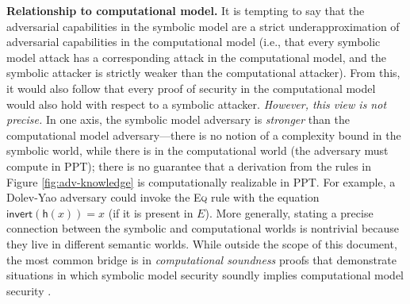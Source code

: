 \documentclass{article}
\theoremstyle{definition}
\begin{document}
\textbf{Relationship to computational model.} 
It is tempting to say that the adversarial capabilities in the symbolic model are a strict underapproximation 
of adversarial capabilities in the computational model (i.e., that every symbolic model attack 
has a corresponding attack in the computational model, and the symbolic attacker 
is strictly weaker than the computational attacker). From this, it would also follow that every 
proof of security in the computational model would also hold with respect to a symbolic attacker.
\emph{However, this view is not precise.} In one axis, the symbolic model adversary is \emph{stronger} 
than the computational model adversary---there is no notion of a complexity bound in the symbolic world, 
while there is in the computational world (the adversary must compute in PPT); 
there is no guarantee that a derivation from the rules in Figure \ref{fig:adv-knowledge} 
is computationally realizable in PPT. 
For example, a Dolev-Yao adversary could invoke the \textsc{Eq} rule with the equation 
$\mathsf{invert}(\mathsf{h}(x)) = x$ (if it is present in $E$).
More generally, stating a precise connection between the symbolic and computational worlds 
is nontrivial because they live in different semantic worlds. While outside the scope of this document, 
the most common bridge is in \emph{computational soundness} proofs that demonstrate situations 
in which symbolic model security soundly implies computational model security \cite{comp_soundness}.



\end{document}
